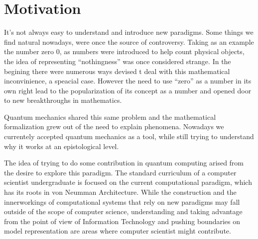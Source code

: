 \section{Motivation}
\label{sec:int_motivation}



It's not always easy to understand and introduce new paradigms. Some things we find natural nowadays, were once the source of controversy. Taking as an example the number zero $0$, as numbers were introduced to help count physical objects, the idea of representing ``nothingness'' was once considered strange. In the begining there were numerous ways devised t deal with this mathematical inconvinience, a speacial case. However the need to use ``zero'' as a number in its own right lead to the popularization of its concept as a number and opened door to new breakthroughs in mathematics\cite{Kaplan2000}. 

Quantum mechanics shared this same problem and the mathematical formalization grew out of the need to explain phenomena\cite{Mehra1982}. Nowadays we currentely accepted quantum mechanics as a tool, while still trying to understand why it works at an epistological level.

The idea of trying to do some contribution in quantum computing arised from the desire to explore this paradigm. The standard curriculum of a computer scientist undergraduate is focused on the current computational paradigm, which has its roots in von Neumman Architecture\cite{neumann45edvac}. While the construction and the innerworkings of computational systems that rely on new paradigms may fall outside of the scope of computer science, understanding and taking advantage from the point of view of Information Technology and pushing boundaries on model representation are areas where computer scientist might contribute.



